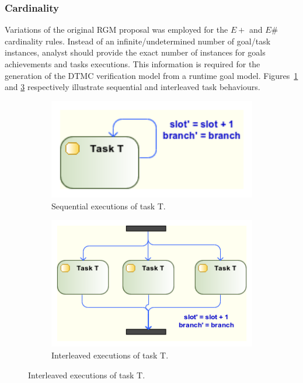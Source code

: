 \subsubsection{Cardinality}

Variations of the original RGM proposal was employed for the $E+$ and $E\#$ cardinality rules. Instead of an infinite/undetermined number of goal/task instances, analyst should provide the exact number of instances for goals achievements and tasks executions. This information is required for the generation of the DTMC verification model from a runtime goal model. Figures~\ref{fig:UML_MUL_SEQ_TSKS} and \ref{fig:UML_MUL_PAR_TSKS} respectively illustrate sequential and interleaved task behaviours.

\begin{figure}[ht!]
        \centering
        \begin{subfigure}[b]{0.3\textwidth}
                \includegraphics[width=1\textwidth]{imgs/UML_MUL_SEQ_TSKS.png}
				\caption{Sequential executions of task T.}
				\label{fig:UML_MUL_SEQ_TSKS}
        \end{subfigure}        
        \quad %
        \begin{subfigure}[b]{0.4\textwidth}                
                \includegraphics[width=1\textwidth]{imgs/UML_MUL_PAR_TSKS.png}
				\caption{Interleaved executions of task T.}
				\label{fig:UML_MUL_PAR_TSKS}
        \end{subfigure}%
          
\end{figure}

